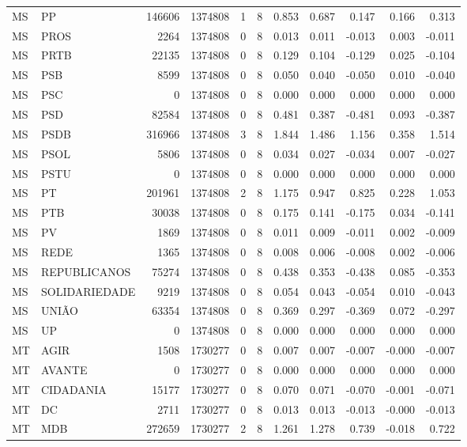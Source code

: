 \begin{landscape}
\begin{longtable}{llrrrrrrrrr}
MS & PP & 146606 & 1374808 & 1 & 8 & 0.853 & 0.687 & 0.147 & 0.166 & 0.313 \\
MS & PROS & 2264 & 1374808 & 0 & 8 & 0.013 & 0.011 & -0.013 & 0.003 & -0.011 \\
MS & PRTB & 22135 & 1374808 & 0 & 8 & 0.129 & 0.104 & -0.129 & 0.025 & -0.104 \\
MS & PSB & 8599 & 1374808 & 0 & 8 & 0.050 & 0.040 & -0.050 & 0.010 & -0.040 \\
MS & PSC & 0 & 1374808 & 0 & 8 & 0.000 & 0.000 & 0.000 & 0.000 & 0.000 \\
MS & PSD & 82584 & 1374808 & 0 & 8 & 0.481 & 0.387 & -0.481 & 0.093 & -0.387 \\
MS & PSDB & 316966 & 1374808 & 3 & 8 & 1.844 & 1.486 & 1.156 & 0.358 & 1.514 \\
MS & PSOL & 5806 & 1374808 & 0 & 8 & 0.034 & 0.027 & -0.034 & 0.007 & -0.027 \\
MS & PSTU & 0 & 1374808 & 0 & 8 & 0.000 & 0.000 & 0.000 & 0.000 & 0.000 \\
MS & PT & 201961 & 1374808 & 2 & 8 & 1.175 & 0.947 & 0.825 & 0.228 & 1.053 \\
MS & PTB & 30038 & 1374808 & 0 & 8 & 0.175 & 0.141 & -0.175 & 0.034 & -0.141 \\
MS & PV & 1869 & 1374808 & 0 & 8 & 0.011 & 0.009 & -0.011 & 0.002 & -0.009 \\
MS & REDE & 1365 & 1374808 & 0 & 8 & 0.008 & 0.006 & -0.008 & 0.002 & -0.006 \\
MS & REPUBLICANOS & 75274 & 1374808 & 0 & 8 & 0.438 & 0.353 & -0.438 & 0.085 & -0.353 \\
MS & SOLIDARIEDADE & 9219 & 1374808 & 0 & 8 & 0.054 & 0.043 & -0.054 & 0.010 & -0.043 \\
MS & UNIÃO & 63354 & 1374808 & 0 & 8 & 0.369 & 0.297 & -0.369 & 0.072 & -0.297 \\
MS & UP & 0 & 1374808 & 0 & 8 & 0.000 & 0.000 & 0.000 & 0.000 & 0.000 \\
MT & AGIR & 1508 & 1730277 & 0 & 8 & 0.007 & 0.007 & -0.007 & -0.000 & -0.007 \\
MT & AVANTE & 0 & 1730277 & 0 & 8 & 0.000 & 0.000 & 0.000 & 0.000 & 0.000 \\
MT & CIDADANIA & 15177 & 1730277 & 0 & 8 & 0.070 & 0.071 & -0.070 & -0.001 & -0.071 \\
MT & DC & 2711 & 1730277 & 0 & 8 & 0.013 & 0.013 & -0.013 & -0.000 & -0.013 \\
MT & MDB & 272659 & 1730277 & 2 & 8 & 1.261 & 1.278 & 0.739 & -0.018 & 0.722 \\

\end{longtable}
\end{landscape}
